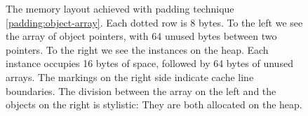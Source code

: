 \begin{figure}
	\caption{The memory layout achieved with padding technique
	\ref{padding:object-array}. Each dotted row is 8 bytes. To the left we
	see the array of object pointers, with 64 unused bytes between two
	pointers. To the right we see the  instances on the heap.
	Each instance occupies 16 bytes of space, followed by 64 bytes of unused
	 arrays. The markings on the right side indicate cache line
	boundaries. The division between the array on the left and the objects
	on the right is stylistic: They are both allocated on the heap.}
	\label{fig:spacedholders}
\end{figure}

